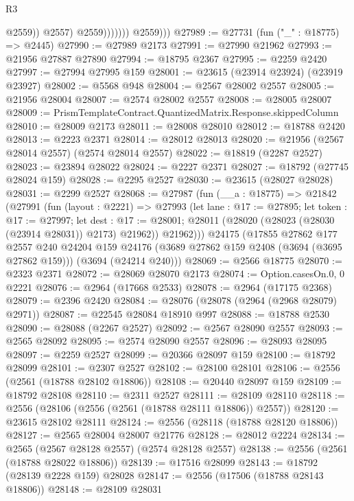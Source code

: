 \begin{lexlean}{R3}
\begin{coremodule}
                              @2559))
                          @2557)
                        @2559)))))))
          @2559)))
@27989 := @27731 (fun ("_" : @18775) => @2445)
@27990 := @27989 @2173
@27991 := @27990 @21962
@27993 := @21956 @27887 @27890
@27994 := @18795 @2367
@27995 := @2259 @2420
@27997 := @27994 @27995 @159
@28001 := @23615 (@23914 @23924) (@23919 @23927)
@28002 := @5568 @948
@28004 := @2567 @28002 @2557
@28005 := @21956 @28004
@28007 := @2574 @28002 @2557
@28008 := @28005 @28007
@28009 := PrismTemplateContract.QuantizedMatrix.Response.skippedColumn
@28010 := @28009 @2173
@28011 := @28008 @28010
@28012 := @18788 @2420
@28013 := @2223 @2371
@28014 := @28012 @28013
@28020 := @21956 (@2567 @28014 @2557) (@2574 @28014 @2557)
@28022 := @18819 (@2287 @2527)
@28023 := @23894 @28022
@28024 := @2227 @2371
@28027 := @18792 (@27745 @28024 @159)
@28028 := @2295 @2527
@28030 := @23615 (@28027 @28028)
@28031 := @2299 @2527
@28068 := @27987
    (fun (__a : @18775) =>
    @21842
      (@27991
        (fun (layout : @2221) =>
        @27993
          (let lane : @17 := @27895;
          let token : @17 := @27997;
          let dest : @17 := @28001; @28011 (@28020 (@28023 (@28030 (@23914 @28031)) @2173) @21962))
          @21962)))
    @24175
    (@17855
      @27862
      @177
      @2557
      @240
      @24204
      @159
      @24176
      (@3689 @27862 @159 @2408 (@3694 (@3695 @27862 @159)))
      (@3694 (@24214 @240)))
@28069 := @2566 @18775
@28070 := @2323 @2371
@28072 := @28069 @28070 @2173
@28074 := Option.casesOn.{0, 0} @2221
@28076 := @2964 (@17668 @2533)
@28078 := @2964 (@17175 @2368)
@28079 := @2396 @2420
@28084 := @28076 (@28078 (@2964 (@2968 @28079) @2971))
@28087 := @22545 @28084 @18910 @997
@28088 := @18788 @2530
@28090 := @28088 (@2267 @2527)
@28092 := @2567 @28090 @2557
@28093 := @2565 @28092
@28095 := @2574 @28090 @2557
@28096 := @28093 @28095
@28097 := @2259 @2527
@28099 := @20366 @28097 @159
@28100 := @18792 @28099
@28101 := @2307 @2527
@28102 := @28100 @28101
@28106 := @2556 (@2561 (@18788 @28102 @18806))
@28108 := @20440 @28097 @159
@28109 := @18792 @28108
@28110 := @2311 @2527
@28111 := @28109 @28110
@28118 := @2556 (@28106 (@2556 (@2561 (@18788 @28111 @18806)) @2557))
@28120 := @23615 @28102 @28111
@28124 := @2556 (@28118 (@18788 @28120 @18806))
@28127 := @2565 @28004 @28007 @21776
@28128 := @28012 @2224
@28134 := @2565 (@2567 @28128 @2557) (@2574 @28128 @2557)
@28138 := @2556 (@2561 (@18788 @28022 @18806))
@28139 := @17516 @28099
@28143 := @18792 (@28139 @2228 @159) @28028
@28147 := @2556 (@17506 (@18788 @28143 @18806))
@28148 := @28109 @28031

\end{coremodule}
\end{lexlean}
